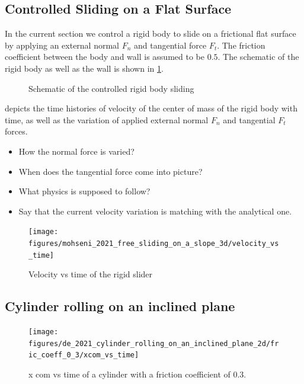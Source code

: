 \documentclass[preprint,12pt]{elsarticle}
\begin{document}
\FloatBarrier%
\subsection{Controlled Sliding on a Flat Surface}
\label{sec:controlled-rigid-body-sliding}

In the current section we control a rigid body to slide on a frictional flat
surface by applying an external normal $F_n$ and tangential force $F_t$. The
friction coefficient between the body and wall is assumed to be $0.5$. The
schematic of the rigid body as well as the wall is shown in
\cref{fig:schematic-controlled-rigid-body-sliding}.
\begin{figure}[!htpb]
  \centering
  \caption{Schematic of the controlled rigid body sliding}
\label{fig:schematic-controlled-rigid-body-sliding}
\end{figure}

 depicts the time histories of
velocity of the center of mass of the rigid body with time, as well as the
variation of applied external normal $F_n$ and tangential $F_t$ forces.
\begin{itemize}
\item How the normal force is varied?
\item When does the tangential force come into picture?
\item What physics is supposed to follow?
\item Say that the current velocity variation is matching with the analytical one.
\end{itemize}
\begin{figure}[!htpb]
  \centering
  \texttt{[image: figures/mohseni\_2021\_free\_sliding\_on\_a\_slope\_3d/velocity\_vs\_time]}
  \caption{Velocity vs time of the rigid slider}
\label{fig:velocity-vs-time-controlled-sliding}
\end{figure}


\FloatBarrier%
\subsection{Cylinder rolling on an inclined plane}
\label{sec:cylinder-rolling-on-an-inclined-plane}


\begin{figure}[!htpb]
  \centering
  \texttt{[image: figures/de\_2021\_cylinder\_rolling\_on\_an\_inclined\_plane\_2d/fric\_coeff\_0\_3/xcom\_vs\_time]}
  \caption{x com vs time of a cylinder with a friction coefficient of $0.3$.}
\label{fig:cylinder-xcom-vs-time-fric-0-3}
\end{figure}
\end{document}
